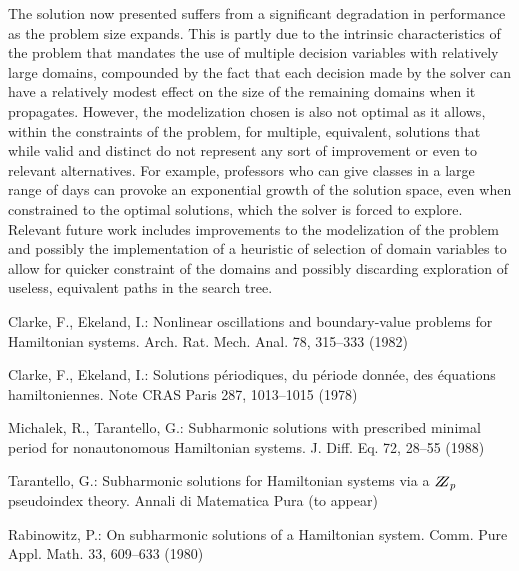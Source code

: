 \documentclass{llncs}
\begin{document}
The solution now presented suffers from a significant degradation in performance as the problem size expands. This is partly due to the intrinsic characteristics of the problem that mandates the use of multiple decision variables with  relatively large domains, compounded by the fact that each decision made by the solver can have a relatively modest effect on the size of the remaining domains when it propagates. However, the modelization chosen is also not optimal as it allows, within the constraints of the problem, for multiple, equivalent, solutions that while valid and distinct do not represent any sort of improvement or even to relevant alternatives. For example, professors who can give classes in a large range of days can provoke an exponential growth of the solution space, even when constrained to the optimal solutions, which the solver is forced to explore. Relevant future work includes improvements to the modelization of the problem and possibly the implementation of a heuristic of selection of domain variables to allow for quicker constraint of the domains and possibly discarding exploration of useless, equivalent paths in the search tree.
 
%
%
\begin{thebibliography}{5}
%
Clarke, F., Ekeland, I.:
Nonlinear oscillations and
boundary-value problems for Hamiltonian systems.
Arch. Rat. Mech. Anal. 78, 315--333 (1982)

Clarke, F., Ekeland, I.:
Solutions p\'{e}riodiques, du
p\'{e}riode donn\'{e}e, des \'{e}quations hamiltoniennes.
Note CRAS Paris 287, 1013--1015 (1978)

Michalek, R., Tarantello, G.:
Subharmonic solutions with prescribed minimal
period for nonautonomous Hamiltonian systems.
J. Diff. Eq. 72, 28--55 (1988)

Tarantello, G.:
Subharmonic solutions for Hamiltonian
systems via a $\bbbz_{p}$ pseudoindex theory.
Annali di Matematica Pura (to appear)

Rabinowitz, P.:
On subharmonic solutions of a Hamiltonian system.
Comm. Pure Appl. Math. 33, 609--633 (1980)

\end{thebibliography}
\end{document}
